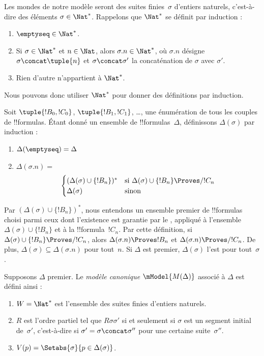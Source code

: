 \documentclass[../../../include/open-logic-section]{subfiles}
\begin{document}


Les mondes de notre modèle seront des suites finies~$\sigma$
d'entiers naturels, c'est-à-dire des éléments
$\sigma \in \Nat^*$. Rappelons que $\Nat^*$ se définit par induction :
\begin{enumerate}
\item $\emptyseq \in \Nat^*$.
\item Si $\sigma \in \Nat^*$ et $n \in \Nat$, alors
  $\sigma.n \in \Nat^*$, où $\sigma.n$ désigne
  $\sigma \concat \tuple{n}$ et $\sigma \concat \sigma'$ la
  concaténation de $\sigma$ avec $\sigma'$.
\item Rien d'autre n'appartient à $\Nat^*$.
\end{enumerate}
Nous pouvons donc utiliser $\Nat^*$ pour donner des définitions par
induction.

Soit $\tuple{!B_0, !C_0}$, $\tuple{!B_1, !C_1}$, \dots, une
énumération de tous les couples de !!{formula}s. Étant donné un
ensemble de !!{formula}s~$\Delta$, définissons $\Delta(\sigma)$
par induction :
\begin{enumerate}
\item $\Delta(\emptyseq) = \Delta$
\item $\Delta(\sigma.n) = {}$
  \[
  \begin{cases}
    (\Delta(\sigma) \cup \{!B_n\})^* &
    \text{si $\Delta(\sigma) \cup \{!B_n\} \Proves/ !C_n$} \\
    \Delta(\sigma) & \text{sinon}
  \end{cases}
  \]
\end{enumerate}
Par $(\Delta(\sigma) \cup \{!B_n\})^*$, nous entendons un ensemble
premier de !!{formula}s choisi parmi ceux dont l'existence est garantie par le
, appliqué à l'ensemble
$\Delta(\sigma) \cup \{!B_n\}$ et à la !!{formula}~$!C_n$.
Par cette définition, si
$\Delta(\sigma) \cup \{!B_n\} \Proves/ !C_n$, alors
$\Delta(\sigma.n) \Proves !B_n$ et
$\Delta(\sigma.n) \Proves/ !C_n$. De plus,
$\Delta(\sigma) \subseteq \Delta(\sigma.n)$ pour tout~$n$.
Si $\Delta$ est premier, $\Delta(\sigma)$ l'est pour tout~$\sigma$.

\begin{defn}
  Supposons $\Delta$ premier. Le \emph{modèle canonique}
  $\mModel{M(\Delta)}$ associé à $\Delta$ est défini ainsi :
  \begin{enumerate}
  \item $W = \Nat^*$ est l'ensemble des suites finies d'entiers
    naturels.
  \item $R$ est l'ordre partiel tel que $R\sigma\sigma'$ si et
    seulement si $\sigma$ est un segment initial de~$\sigma'$,
    c'est-à-dire si $\sigma' = \sigma \concat \sigma''$ pour une
    certaine suite~$\sigma''$.
  \item $V(p) = \Setabs{\sigma}{p \in \Delta(\sigma)}$.
  \end{enumerate}
\end{defn}
\end{document}

